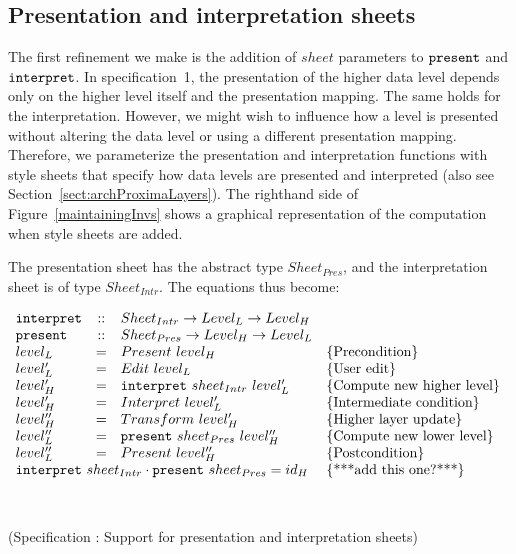%																
%																
%																
\subsection{Presentation and interpretation sheets} \label{sect:maintainingSheet}

The first refinement we make is the addition of $sheet$ parameters to ${\tt present}$ and ${\tt interpret}$. In specification~1, the presentation of the higher data level depends only on the higher level itself and the presentation mapping. The same holds for the interpretation. However, we might wish to influence how a level is presented without altering the data level or using a different presentation mapping. Therefore, we parameterize the presentation and interpretation functions with style sheets that specify how data levels are presented and interpreted (also see Section~\ref{sect:archProximaLayers}). The righthand side of Figure~\ref{maintainingInvs} shows a graphical representation of the computation when style sheets are added. 

The presentation sheet has the abstract type $Sheet_{Pres}$, and the interpretation sheet is of type $Sheet_{Intr}$. The equations thus become:

\begin{small}
 \label{spec:sheets}
\( \begin{array}{lcll}
{\tt interpret} &::& Sheet_{Intr} \rightarrow  Level_{L} \rightarrow Level_{H} \\
{\tt present} &::& Sheet_{Pres} \rightarrow  Level_{H} \rightarrow Level_{L} \\
level_{L} & = & Present~level_{H}					& \text{\{Precondition\}}\\
level'_{L} & = & Edit~level_{L}						& \text{\{User edit\}}\\
level'_{H} & = & {\tt interpret}~sheet_{Intr}~level'_{L}	& \text{\{Compute new higher level\}}\\
level'_{H} & = & Interpret~level'_{L}					& \text{\{Intermediate condition\}}\\
level''_{H}& = & Transform~level'_{H} 					& \text{\{Higher layer update\}}\\
level''_{L} & = & {\tt present}~sheet_{Pres}~level''_{H}    & \text{\{Compute new lower level\}}\\
level''_{L} & = & Present~level''_{H}					& \text{\{Postcondition\}}\\
\lefteqn{{\tt interpret}~sheet_{Intr} \cdot {\tt present}~sheet_{Pres} = id_{H}} & & & \text{\{***add this one?***\}}\\
\end{array}\)\end{small}\\
\begin{center}(Specification \thespecification: Support for presentation and interpretation sheets)\end{center}\vspace{1em}

